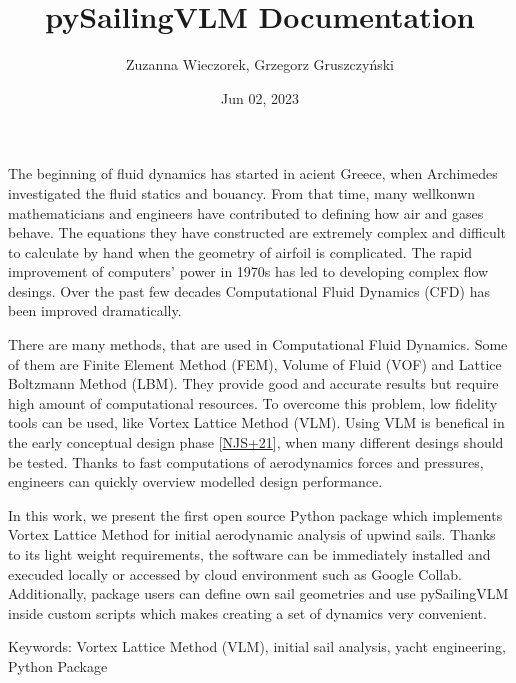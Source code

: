 \documentclass[letterpaper,10pt,english]{jupyterBook}
\title{pySailingVLM Documentation}
\date{Jun 02, 2023}
\author{Zuzanna Wieczorek, Grzegorz Gruszczyński}
\begin{document}
\pagestyle{empty}
\sphinxmaketitle
 
\clearpage

\pagestyle{plain}
\sphinxtableofcontents
\pagestyle{normal}
\label{\detokenize{chapters/intro::doc}}


\sphinxAtStartPar
The beginning of fluid dynamics has started in acient Greece, when Archimedes investigated the fluid statics and bouancy. From that time, many well\sphinxhyphen{}konwn mathematicians and engineers have contributed to defining how air and gases behave. The equations they have constructed are extremely complex and difficult to calculate by hand when the geometry of airfoil is complicated. The rapid improvement of computers’ power in 1970s has led to developing complex flow desings. Over the past few decades Computational Fluid Dynamics (CFD) has been improved dramatically.

\sphinxAtStartPar
There are many methods, that are used in Computational Fluid Dynamics. Some of them are Finite Element Method (FEM), Volume of Fluid (VOF) and Lattice Boltzmann Method (LBM). They provide good and accurate results but require high amount of computational resources. To overcome this problem, low fidelity tools can be used, like Vortex Lattice Method (VLM). Using VLM is benefical in the early conceptual design phase {[}\hyperlink{cite.chapters/bibliography:id7}{NJS+21}{]}, when many different desings should be tested. Thanks to fast computations of aerodynamics forces and pressures, engineers can quickly overview modelled design performance.

\sphinxAtStartPar
In this work, we present the first open source Python package which implements Vortex Lattice Method for initial aerodynamic analysis of upwind sails. Thanks to its light weight requirements, the software can be immediately installed and execuded locally or accessed by cloud environment such as Google Collab. Additionally, package users can define own sail geometries and use pySailingVLM inside custom scripts which makes creating a set of dynamics very convenient.

\sphinxAtStartPar
Keywords: Vortex Lattice Method (VLM), initial sail analysis, yacht engineering, Python Package
\end{document}
